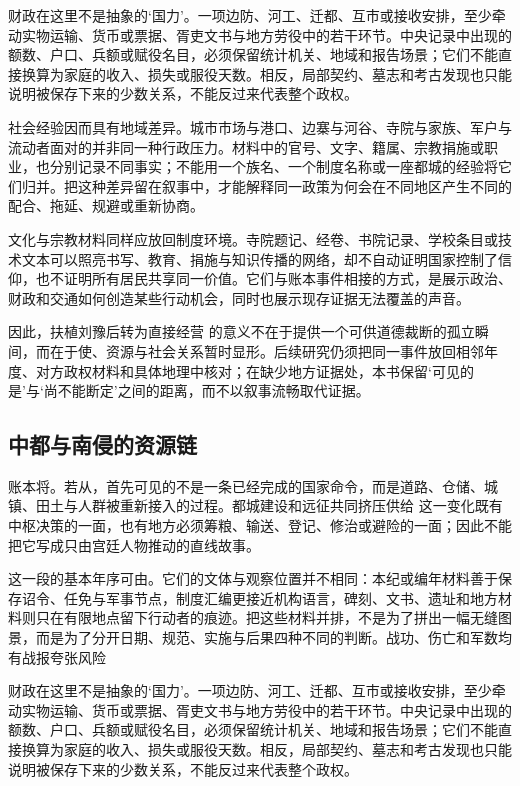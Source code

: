 财政在这里不是抽象的‘国力’。一项边防、河工、迁都、互市或接收安排，至少牵动实物运输、货币或票据、胥吏文书与地方劳役中的若干环节。中央记录中出现的额数、户口、兵额或赋役名目，必须保留统计机关、地域和报告场景；它们不能直接换算为家庭的收入、损失或服役天数。相反，局部契约、墓志和考古发现也只能说明被保存下来的少数关系，不能反过来代表整个政权。

社会经验因而具有地域差异。城市市场与港口、边寨与河谷、寺院与家族、军户与流动者面对的并非同一种行政压力。材料中的官号、文字、籍属、宗教捐施或职业，也分别记录不同事实；不能用一个族名、一个制度名称或一座都城的经验将它们归并。把这种差异留在叙事中，才能解释同一政策为何会在不同地区产生不同的配合、拖延、规避或重新协商。

文化与宗教材料同样应放回制度环境。寺院题记、经卷、书院记录、学校条目或技术文本可以照亮书写、教育、捐施与知识传播的网络，却不自动证明国家控制了信仰，也不证明所有居民共享同一价值。它们与账本事件相接的方式，是展示政治、财政和交通如何创造某些行动机会，同时也展示现存证据无法覆盖的声音。

因此，扶植刘豫后转为直接经营 的意义不在于提供一个可供道德裁断的孤立瞬间，而在于使、资源与社会关系暂时显形。后续研究仍须把同一事件放回相邻年度、对方政权材料和具体地理中核对；在缺少地方证据处，本书保留‘可见的是’与‘尚不能断定’之间的距离，而不以叙事流畅取代证据。

\subsection{中都与南侵的资源链}

账本将。若从，首先可见的不是一条已经完成的国家命令，而是道路、仓储、城镇、田土与人群被重新接入的过程。都城建设和远征共同挤压供给 这一变化既有中枢决策的一面，也有地方必须筹粮、输送、登记、修治或避险的一面；因此不能把它写成只由宫廷人物推动的直线故事。

这一段的基本年序可由。它们的文体与观察位置并不相同：本纪或编年材料善于保存诏令、任免与军事节点，制度汇编更接近机构语言，碑刻、文书、遗址和地方材料则只在有限地点留下行动者的痕迹。把这些材料并排，不是为了拼出一幅无缝图景，而是为了分开日期、规范、实施与后果四种不同的判断。战功、伤亡和军数均有战报夸张风险

财政在这里不是抽象的‘国力’。一项边防、河工、迁都、互市或接收安排，至少牵动实物运输、货币或票据、胥吏文书与地方劳役中的若干环节。中央记录中出现的额数、户口、兵额或赋役名目，必须保留统计机关、地域和报告场景；它们不能直接换算为家庭的收入、损失或服役天数。相反，局部契约、墓志和考古发现也只能说明被保存下来的少数关系，不能反过来代表整个政权。

